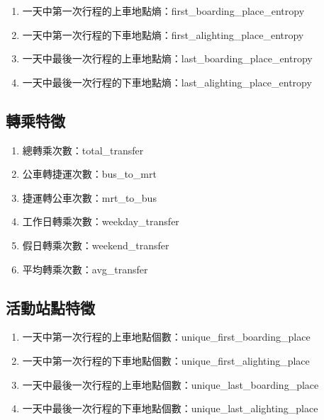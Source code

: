 \begin{enumerate}
\def\labelenumi{\arabic{enumi}.}
\tightlist
\item
  一天中第一次行程的上車地點熵：first\_boarding\_place\_entropy
\item
  一天中第一次行程的下車地點熵：first\_alighting\_place\_entropy
\item
  一天中最後一次行程的上車地點熵：last\_boarding\_place\_entropy
\item
  一天中最後一次行程的下車地點熵：last\_alighting\_place\_entropy
\end{enumerate}

\subsection{轉乘特徵}\label{ux8f49ux4e58ux7279ux5fb5}

\begin{enumerate}
\def\labelenumi{\arabic{enumi}.}
\tightlist
\item
  總轉乘次數：total\_transfer
\item
  公車轉捷運次數：bus\_to\_mrt
\item
  捷運轉公車次數：mrt\_to\_bus
\item
  工作日轉乘次數：weekday\_transfer
\item
  假日轉乘次數：weekend\_transfer
\item
  平均轉乘次數：avg\_transfer
\end{enumerate}

\subsection{活動站點特徵}\label{ux6d3bux52d5ux7ad9ux9edeux7279ux5fb5}

\begin{enumerate}
\def\labelenumi{\arabic{enumi}.}
\tightlist
\item
  一天中第一次行程的上車地點個數：unique\_first\_boarding\_place
\item
  一天中第一次行程的下車地點個數：unique\_first\_alighting\_place
\item
  一天中最後一次行程的上車地點個數：unique\_last\_boarding\_place
\item
  一天中最後一次行程的下車地點個數：unique\_last\_alighting\_place
\end{enumerate}

